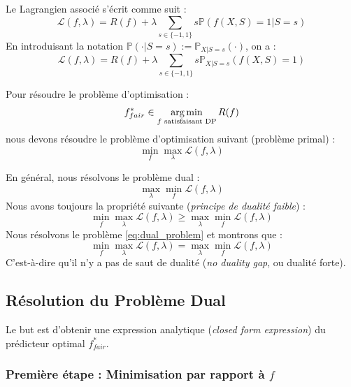 Le Lagrangien associé s'écrit comme suit :
\begin{equation}
    \mathcal{L}(f, \lambda) = R(f) + \lambda \sum_{s \in \{-1, 1\}} s \mathbb{P}(f(X,S)=1 | S=s)
\end{equation}
En introduisant la notation $\mathbb{P}(\cdot | S=s) := \mathbb{P}_{X|S=s}(\cdot)$, on a :
\begin{equation}
    \mathcal{L}(f, \lambda) = R(f) + \lambda \sum_{s \in \{-1, 1\}} s \mathbb{P}_{X|S=s}(f(X,S)=1)
\end{equation}

Pour résoudre le problème d'optimisation :
\begin{equation}
    f^*_{fair} \in \operatorname*{arg\,min}_{f \text{ satisfaisant DP}} R(f)
\end{equation}
nous devons résoudre le problème d'optimisation suivant (problème primal) :
\begin{equation}
    \min_{f} \max_{\lambda} \mathcal{L}(f, \lambda)
\end{equation}

En général, nous résolvons le problème dual :
\begin{equation} \label{eq:dual_problem} \tag{$*$}
    \max_{\lambda} \min_{f} \mathcal{L}(f, \lambda)
\end{equation}
Nous avons toujours la propriété suivante (\textit{principe de dualité faible}) :
\begin{equation}
    \min_{f} \max_{\lambda} \mathcal{L}(f, \lambda) \ge \max_{\lambda} \min_{f} \mathcal{L}(f, \lambda)
\end{equation}
Nous résolvons le problème \eqref{eq:dual_problem} et montrons que :
\begin{equation}
    \min_{f} \max_{\lambda} \mathcal{L}(f, \lambda) = \max_{\lambda} \min_{f} \mathcal{L}(f, \lambda)
\end{equation}
C'est-à-dire qu'il n'y a pas de saut de dualité (\textit{no duality gap}, ou dualité forte).

\subsection{Résolution du Problème Dual}

Le but est d'obtenir une expression analytique (\textit{closed form expression}) du prédicteur optimal $f^*_{fair}$.

\subsubsection{Première étape : Minimisation par rapport à $f$}

